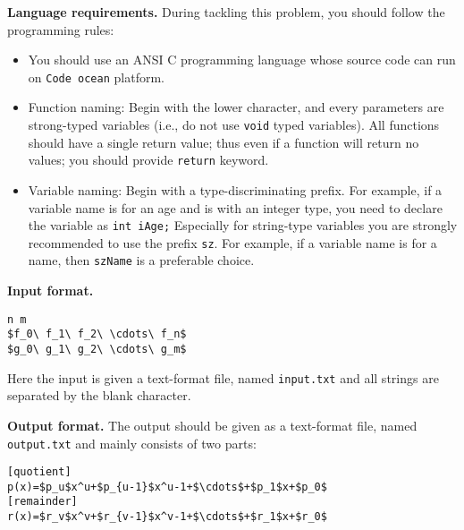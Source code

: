 \documentclass{article}
\begin{document}
\bigskip
\noindent\textbf{Language requirements. }%
During tackling this problem, you should follow the programming rules:
\begin{itemize}
\item You should use an ANSI C programming language whose source code can run on \texttt{Code ocean} platform. 
\item Function naming: Begin with the lower character, and every parameters are strong-typed variables (i.e., do not use \texttt{void} typed variables).
	All functions should have a single return value; thus even if a function will return no values; you should provide \texttt{return} keyword.
\item Variable naming: Begin with a type-discriminating prefix. For example, if a variable name is for an age and is with an integer type,
	you need to declare the variable as \texttt{int iAge;}  Especially for string-type variables you are strongly recommended to use the prefix \texttt{sz}.
	For example, if a variable name is for a name, then \texttt{szName} is a preferable choice.
\end{itemize}

\bigskip
\noindent\textbf{Input format.} %
\begin{lstlisting}
n m
$f_0\ f_1\ f_2\ \cdots\ f_n$ 
$g_0\ g_1\ g_2\ \cdots\ g_m$ 
\end{lstlisting}
Here the input is given a text-format file, named \texttt{input.txt} and all strings are separated by the blank character.

\bigskip
\noindent\textbf{Output format.} %
The output should be given as a text-format file, named \texttt{output.txt} and mainly consists of two parts:
\begin{lstlisting}
[quotient]
p(x)=$p_u$x^u+$p_{u-1}$x^u-1+$\cdots$+$p_1$x+$p_0$
[remainder]
r(x)=$r_v$x^v+$r_{v-1}$x^v-1+$\cdots$+$r_1$x+$r_0$
\end{lstlisting}

\newpage
\end{document}

